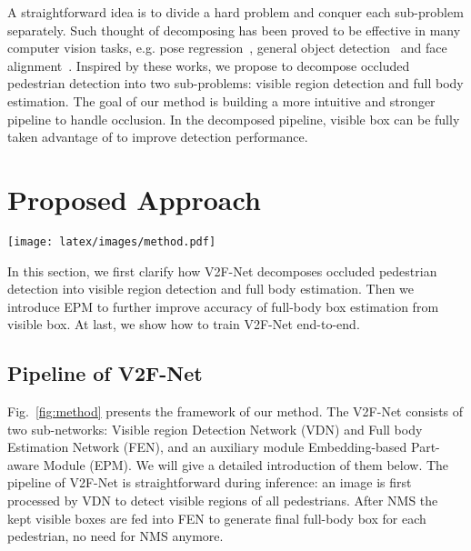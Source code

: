 \documentclass[10pt,twocolumn,letterpaper]{article}
\begin{document}
A straightforward idea is to divide a hard problem and conquer each sub-problem separately. Such thought of decomposing has been proved to be effective in many computer vision tasks, e.g. pose regression~\cite{dollar2010cascaded_pose}, general object detection~\cite{cai2019cascadercnn} and face alignment~\cite{cao2014face,yan2013learn}. Inspired by these works, we propose to decompose occluded pedestrian detection into two sub-problems: visible region detection and full body estimation. The goal of our method is building a more intuitive and stronger pipeline to handle occlusion. In the decomposed pipeline, visible box can be fully taken advantage of to improve detection performance.

\section{Proposed Approach}

\begin{figure*}[!t]
\begin{center}
 \texttt{[image: latex/images/method.pdf]}
\end{center}
   \caption{Framework of V2F-Net. The input image is first processed by Visible region Detection Network (VDN) to detect visible regions of all pedestrians. After NMS (only necessary during inference) these kept boxes are fed into Full body Estimation Network (FEN) to estimate the full body box for each pedestrian. During training, the visible boxes will also be passed to Embedding-based Part-aware Module (EPM) to predict visibility for each part of corresponding pedestrian. By supervising the part visibility, EPM works as an auxiliary module to make the estimation of full body be more accurate.  is dot product operation. The dashed line and rectangle indicate they can be discarded during inference. In the output image, the green boxes and digits represent divided parts and  predicted scores by EPM respectively.}
\label{fig:method}
\end{figure*}

 In this section, we first clarify how V2F-Net decomposes occluded pedestrian detection into visible region detection and full body estimation. Then we introduce EPM to further improve accuracy of full-body box estimation from visible box. At last, we show how to train V2F-Net end-to-end.






\subsection{Pipeline of V2F-Net}
\label{sec:ppl}
Fig.~\ref{fig:method} presents the framework of our method. The V2F-Net consists of two sub-networks: Visible region Detection Network (VDN) and Full body Estimation Network (FEN), and an auxiliary module Embedding-based Part-aware Module (EPM). We will give a detailed introduction of them below. The pipeline of V2F-Net is straightforward during inference: an image is first processed by VDN to detect visible regions of all pedestrians. After NMS the kept visible boxes are fed into FEN to generate final full-body box for each pedestrian, no need for NMS anymore.
\end{document}
